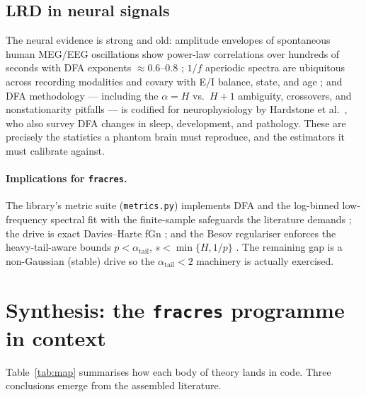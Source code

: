\documentclass[11pt,a4paper]{article}
\begin{document}
\subsection{LRD in neural signals}

The neural evidence is strong and old: amplitude envelopes of spontaneous
human MEG/EEG oscillations show power-law correlations over hundreds of
seconds with DFA exponents $\approx 0.6$--$0.8$
\cite{linkenkaer2001long}; $1/f$ aperiodic spectra are ubiquitous across
recording modalities and covary with E/I balance, state, and age
\cite{he2014scale,voytek2015dynamic}; and DFA methodology --- including the
$\alpha = H$ vs.\ $H+1$ ambiguity, crossovers, and nonstationarity pitfalls
--- is codified for neurophysiology by Hardstone et al.\
\cite{hardstone2012detrended}, who also survey DFA changes in sleep,
development, and pathology. These are precisely the statistics a phantom
brain must reproduce, and the estimators it must calibrate against.

\paragraph{Implications for \texttt{fracres}.}
The library's metric suite (\texttt{metrics.py}) implements DFA and the
log-binned low-frequency spectral fit with the finite-sample safeguards the
literature demands \cite{taqqu1995estimators,hardstone2012detrended}; the
drive is exact Davies--Harte fGn \cite{davies1987tests}; and the Besov
regulariser enforces the heavy-tail-aware bounds $p < \alpha_{\mathrm{tail}}$,
$s < \min\{H,1/p\}$ \cite{samorodnitsky2007long,abry2003self}. The remaining
gap is a non-Gaussian (stable) drive so the $\alpha_{\mathrm{tail}} < 2$
machinery is actually exercised.

\section{Synthesis: the \texttt{fracres} programme in context}
\label{sec:synthesis}

Table~\ref{tab:map} summarises how each body of theory lands in code. Three
conclusions emerge from the assembled literature.
\end{document}
